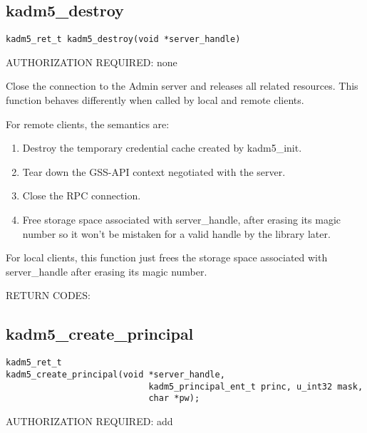 \subsection{kadm5_destroy}

\begin{verbatim}
kadm5_ret_t kadm5_destroy(void *server_handle)
\end{verbatim}

AUTHORIZATION REQUIRED: none

Close the connection to the Admin server and releases all related
resources.  This function behaves differently when called by local and
remote clients.

For remote clients, the semantics are:

\begin{enumerate}
\item Destroy the temporary credential cache created by
kadm5_init.

\item Tear down the GSS-API context negotiated with the server.

\item Close the RPC connection.

\item Free storage space associated with server_handle, after erasing
its magic number so it won't be mistaken for a valid handle by the
library later.
\end{enumerate}

For local clients, this function just frees the storage space
associated with server_handle after erasing its magic number.

RETURN CODES:

\subsection{kadm5_create_principal}

\begin{verbatim}
kadm5_ret_t
kadm5_create_principal(void *server_handle,
                            kadm5_principal_ent_t princ, u_int32 mask,
                            char *pw);
\end{verbatim}

AUTHORIZATION REQUIRED: add

